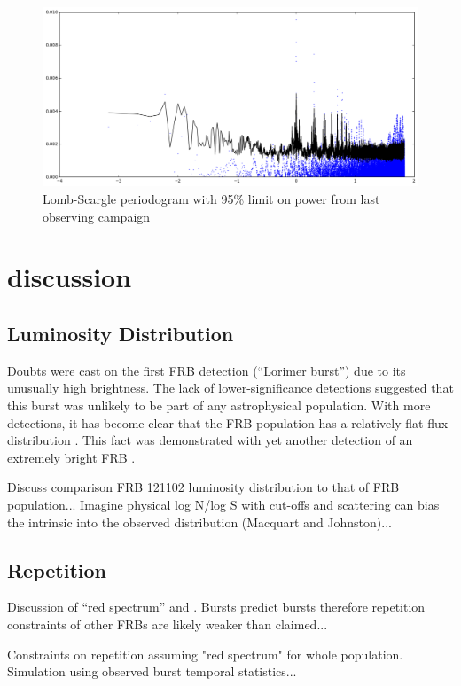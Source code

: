 \documentclass{emulateapj}
\begin{document}
\begin{figure}[htb]
\begin{center}
\includegraphics[width=0.9\columnwidth]{lombscargle}
\caption{Lomb-Scargle periodogram with 95\% limit on power from last observing campaign
\label{fig:ls}}
\end{center}
\end{figure}


\section{discussion}

\subsection{Luminosity Distribution}
Doubts were cast on the first FRB detection (``Lorimer burst'') due to its unusually high brightness. The lack of lower-significance detections suggested that this burst was unlikely to be part of any astrophysical population. With more detections, it has become clear that the FRB population has a relatively flat flux distribution \citep{2016ApJ...830...75V, 2016arXiv161100458L}. This fact was demonstrated with yet another detection of an extremely bright FRB \citep{2016arXiv161105758R}.

Discuss comparison FRB 121102 luminosity distribution to that of FRB population...
Imagine physical log N/log S with cut-offs and scattering can bias the intrinsic into the observed distribution (Macquart and Johnston)...


\subsection{Repetition}
Discussion of ``red spectrum'' and \citet{2016MNRAS.458L..89C}. Bursts predict bursts therefore repetition constraints of other FRBs are likely weaker than claimed...

Constraints on repetition assuming "red spectrum" for whole population. Simulation using observed burst temporal statistics...
\end{document}
